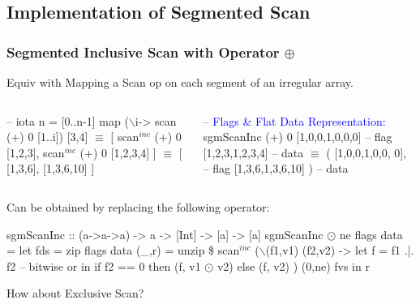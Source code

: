 \documentclass{beamer}
\newcommand{\blue}[1]{\textcolor{Blue}{{#1}}}
\renewcommand{\emph}[1]{\textcolor{structure}{#1}}
\newcommand{\emp}[1]{\textcolor{DikuRed}{ #1}}
\newcommand{\emphh}[1]{\textcolor{CosGreen}{ #1}}
\newcommand{\mymath}[1]{$ #1 $}
\newcommand{\myindu}[1]{^{#1}}
\begin{document}
\subsection{Implementation of Segmented Scan}

\begin{frame}[fragile]
	\tableofcontents[currentsubsection]
\end{frame}


\begin{frame}[fragile,t]
  \frametitle{Segmented Inclusive Scan with Operator $\oplus$}

\emphh{Equiv with Mapping a Scan op on each segment of an irregular array.}

\begin{columns}
\begin{colorcode}
-- iota n = [0..n-1]
map (\mymath{\backslash}i-> scan (+) 0 [1..i]) [3,4] \emph{\mymath{\equiv}}
[ scan\mymath{\myindu{inc}} (+) 0 [1,2,3], 
  scan\mymath{\myindu{inc}} (+) 0 [1,2,3,4] ] 
      \emph{\mymath{\equiv}}
[ [1,3,6], [1,3,6,10] ]
\end{colorcode}
\begin{colorcode}
-- \blue{Flags \& Flat Data Representation:}
sgmScanInc (+) 0 [1,0,0,1,0,0,0] -- \emph{flag}
                 [1,2,3,1,2,3,4] -- \emp{data}
    \emph{\mymath{\equiv}}
( [1,0,0,1,0,0, 0],              -- \emph{flag}
  [1,3,6,1,3,6,10] )             -- \emp{data}
\end{colorcode}
\end{columns}
\medskip

\emphh{Can be obtained by replacing the following operator:}
\smallskip

\begin{colorcode}
sgmScanInc :: (a->a->a) -> a -> [Int] -> [a] -> [a]
sgmScanInc \mymath{\odot} ne flags data = 
  let fds = zip flags data
      (_,r) = unzip \$ 
              scan\mymath{\myindu{inc}} (\mymath{\backslash}(f1,v1) (f2,v2) -> 
                        let f = f1 .|. f2  -- bitwise or
                        in  if f2 == 0
                            then (f, v1 \mymath{\odot} v2)
                            else (f, v2)
                     ) (0,ne) fvs
  in  r
\end{colorcode}
\bigskip

\alert{How about Exclusive Scan?}

\end{frame}
\end{document}
